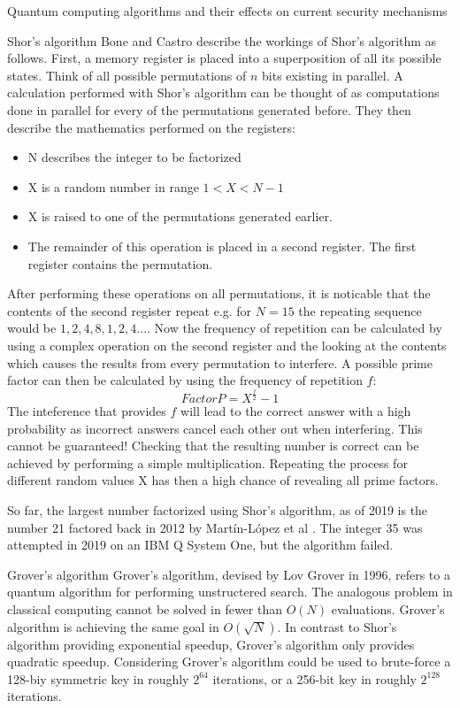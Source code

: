 \documentclass[aps,preprintnumbers,twocolumn]{revtex4}
\begin{document}
\begin{section}{Quantum computing algorithms and their effects on current security mechanisms}
\begin{subsection}{Shor's algorithm}
Bone and Castro \cite{Bone} describe the workings of Shor's algorithm as follows. First, a memory register is placed into a superposition of all its possible states. Think of all possible permutations of $n$ bits existing in parallel.
A calculation performed with Shor's algorithm can be thought of as computations done in parallel for every of the permutations generated before. 
They then describe the mathematics performed on the registers: 
\begin{itemize} 
    \item N describes the integer to be factorized
    \item X is a random number in range $1 < X < N-1$
    \item X is raised to one of the permutations generated earlier.
    \item The remainder of this operation is placed in a second register. The first register contains the permutation.
\end{itemize}
After performing these operations on all permutations, it is noticable that the contents of the second register repeat e.g. for $N = 15$ the repeating sequence would be $1,2,4,8,1,2,4...$.
Now the frequency of repetition can be calculated by using a complex operation on the second register and the looking at the contents which causes the results from every permutation to interfere. A possible prime factor can then be calculated by using the frequency of repetition $f$:
\begin{equation}
Factor P = X^{\frac{f}{2}}-1
\end{equation}
The inteference that provides $f$ will lead to the correct answer with a high probability as incorrect answers cancel each other out when interfering. This cannot be guaranteed! Checking that the resulting number is correct can be achieved by performing a simple multiplication. Repeating the process for different random values X has then a high chance of revealing all prime factors.

So far, the largest number factorized using Shor's algorithm, 
as of 2019 is the number 21 factored back in 2012 by Martín-López et al \cite{article}. 
The integer 35 was attempted in 2019 on an IBM Q System One, 
but the algorithm failed. 
\end{subsection}

\begin{subsection}{Grover's algorithm}
Grover's algorithm, devised by Lov Grover in 1996,
refers to a quantum algorithm for performing unstructered search. 
The analogous problem in classical computing cannot be solved in fewer than $O(N)$ evaluations. 
Grover's algorithm is achieving the same goal in $O(\sqrt{N})$. 
In contrast to Shor's algorithm providing exponential speedup, 
Grover's algorithm only provides quadratic speedup. 
Considering Grover's algorithm could be used to brute-force a 128-biy symmetric key in roughly $2^{64}$ iterations, 
or a 256-bit key in roughly $2^{128}$ iterations.


\end{subsection}
\end{section}
\end{document}
